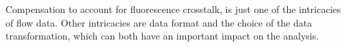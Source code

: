 
Compensation to account for fluorescence crosstalk, is just one of the intricacies of flow data.
Other intricacies are data format
and the choice of
the data transformation,
which can both have an important impact on the analysis.

